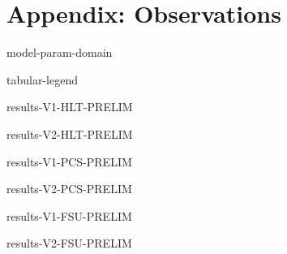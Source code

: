 \hypertarget{apx:Observations}{%
\chapter{Appendix: Observations}\label{apx:Observations}}


\newcommand{\ObservationTable}[2]{%
\begin{table}[!ht]
\centering
\caption{%
\label{tab:V#1-#2}%
Observations for $\CGKAmod{\VersionOne}{T}{N} \models \LTLPredicate{#2}$.
}%
{results-V#1-#2-PRELIM}
\end{table}
}

\begin{table}[!ht]
\centering
\caption{%
\label{tab:model-param-domain}%
Verification domain of \( \CGKAmod{P}{T}{N} \models \varphi \) parameters.
}%
{model-param-domain}
\end{table}

\begin{table}[!ht]
\centering
\caption{%
\label{tab:table-legend}%
Legend of symbols appearing in tables.
}%
{tabular-legend}
\end{table}

\ObservationTable{1}{HLT}
\ObservationTable{2}{HLT}
\ObservationTable{1}{PCS}
\ObservationTable{2}{PCS}
\ObservationTable{1}{FSU}
\ObservationTable{2}{FSU}
